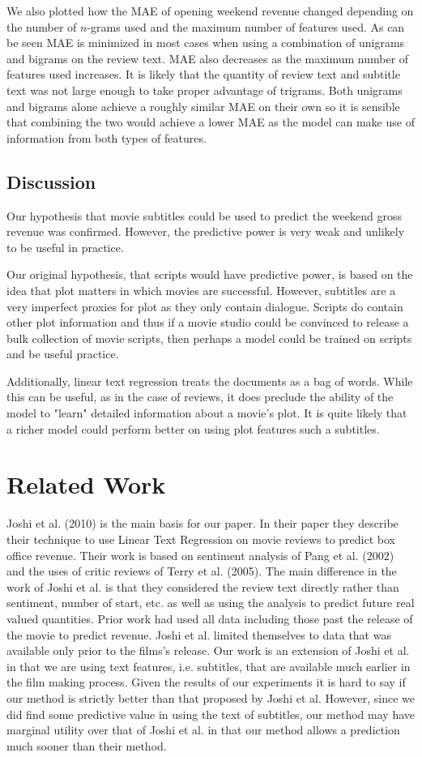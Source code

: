 \documentclass[11pt]{article}
\begin{document}
We also plotted how the MAE of opening weekend revenue changed depending on the number
of $n$-grams used and the maximum number of features used. As can be seen MAE is minimized
in most cases when using a combination of unigrams and bigrams on the review text. MAE
also decreases as the maximum number of features used increases. It is likely that the
quantity of review text and subtitle text was not large enough to take proper advantage
of trigrams. Both unigrams and bigrams alone achieve a roughly similar MAE on their own
so it is sensible that combining the two would achieve a lower MAE as the model can make
use of information from both types of features.

\subsection{Discussion}
Our hypothesis that movie subtitles could be used to predict the weekend gross revenue
was confirmed. However, the predictive power is very weak and unlikely to be useful in practice. 

Our original hypothesis, that scripts would have predictive power, is based on
the idea that plot matters in which movies are successful. However, subtitles are
a very imperfect proxies for plot as they only contain dialogue. Scripts do contain
other plot information and thus if a movie studio could be convinced to release a bulk
collection of movie scripts, then perhaps a model could be trained on scripts and be
useful practice.

Additionally, linear text regression treats the documents as a bag of words. While
this can be useful, as in the case of reviews, it does preclude the ability of the
model to "learn" detailed information about a movie's plot. It is quite likely that
a richer model could perform better on using plot features such a subtitles.

\section{Related Work}
Joshi et al. (2010) is the main basis for our paper. In their paper they describe their
technique to use Linear Text Regression on movie reviews to predict box office revenue.
Their work is based on sentiment analysis of Pang et al. (2002) and the uses of critic
reviews of Terry et al. (2005). The main difference in the work of Joshi et al. is that
they considered the review text directly rather than sentiment, number of start, etc. as
well as using the analysis to predict future real valued quantities. Prior work had
used all data including those past the release of the movie to predict revenue. Joshi
et al. limited themselves to data that was available only prior to the films's release.
Our work is an extension of Joshi et al. in that we are using text features, i.e.
subtitles, that are available much earlier in the film making process. Given the results
of our experiments it is hard to say if our method is strictly better than that proposed
by Joshi et al. However, since we did find some predictive value in using the text of
subtitles, our method may have marginal utility over that of Joshi et al. in that our
method allows a prediction much sooner than their method.
\end{document}
